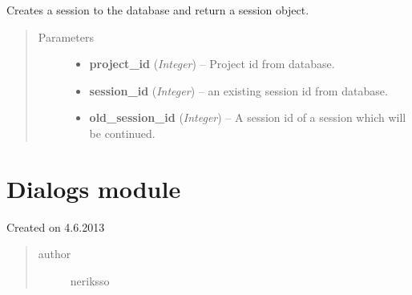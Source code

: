 \documentclass[letterpaper,10pt,english]{sphinxmanual}
\begin{document}

\begin{fulllineitems}
\label{controller:controller.session.start_new_session}
Creates a session to the database and return a session object.
\begin{quote}\begin{description}
\item[{Parameters}] \leavevmode\begin{itemize}
\item {} 
\textbf{project\_id} (\emph{Integer}) -- Project id from database.

\item {} 
\textbf{session\_id} (\emph{Integer}) -- an existing session id from database.

\item {} 
\textbf{old\_session\_id} (\emph{Integer}) -- A session id of a session which will be continued.

\end{itemize}

\end{description}\end{quote}

\end{fulllineitems}



\section{Dialogs module}
\label{dialogs:dialogs-module}\label{dialogs::doc}\label{dialogs:module-dialogs}
Created on 4.6.2013
\begin{quote}\begin{description}
\item[{author}] \leavevmode
neriksso

\end{description}\end{quote}
\end{document}
